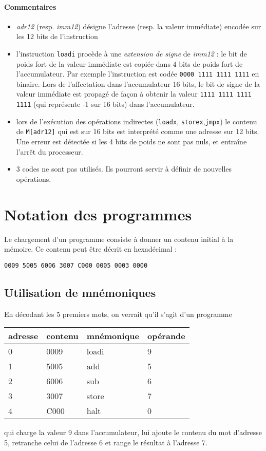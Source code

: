 \documentclass[10pt]{article}
\begin{document}
\paragraph{Commentaires}
\begin{itemize}
\item \emph{adr12} (resp. \emph{imm12}) désigne l'adresse (resp. la valeur immédiate) encodée sur les 12 bits de l'instruction
\item l'instruction \texttt{loadi} procède à une \emph{extension de
  signe} de \emph{imm12} : le bit de poids fort de la valeur immédiate
  est copiée dans 4 bits de poids fort de l'accumulateur. Par exemple
  l'instruction  est codée \texttt{0000 1111
    1111 1111} en binaire. Lors de l'affectation dans l'accumulateur
  16 bits, le bit de signe de la valeur immédiate est propagé de façon
  à obtenir la valeur \texttt{1111 1111 1111 1111} (qui représente -1
  sur 16 bits) dans l'accumulateur.
\item lors de l'exécution des opérations indirectes 
(\texttt{loadx}, \texttt{storex},\texttt{jmpx})
le contenu de \verb/M[adr12]/  qui est sur 16 bits est interprété
comme une adresse sur 12 bits. Une erreur est détectée si les 4 bits de poids 
ne sont pas nuls, et entraîne l'arrêt du processeur.
\item 3 codes ne sont pas utilisés. Ils pourront servir à définir de nouvelles opérations.
\end{itemize}
\section{Notation des programmes}

Le chargement d'un programme consiste à donner un contenu initial à la mémoire.
Ce contenu peut être décrit en hexadécimal :

\begin{center}
\begin{lstlisting}
0009 5005 6006 3007 C000 0005 0003 0000
\end{lstlisting}
\end{center}

\subsection{Utilisation de mnémoniques}

En décodant les 5 premiers mots, on verrait qu'il s'agit d'un programme
\begin{center}
\begin{tabular}{ll|ll}
adresse & contenu & mnémonique & opérande \\
\hline
0  & 0009 & loadi & 9 \\
1 & 5005 & add & 5 \\
2 & 6006 & sub & 6 \\
3 &  3007 & store & 7 \\
4 &  C000 & halt & 0 
\end{tabular}
\end{center}
qui charge la valeur 9 dans l'accumulateur, lui ajoute le contenu du
mot d'adresse 5, retranche celui de l'adresse 6 et range le résultat à
l'adresse 7.
\end{document}

